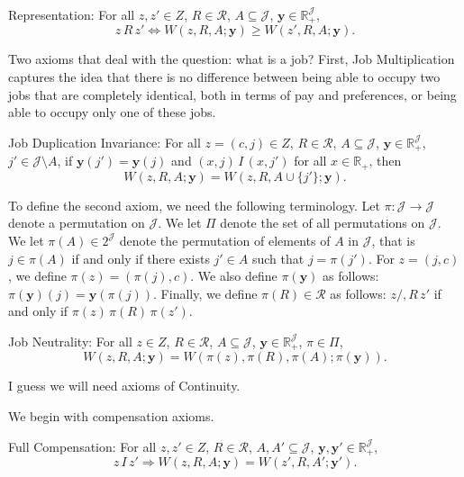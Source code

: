 \documentclass[12pt]{article}
\begin{document}
Representation: For all $z,z'\in Z$, $R\in \mathcal{R}$, $A\subseteq \mathcal{J}$, $\mathbf{y}\in \mathbb{R}_{+}^{\mathcal{J}}$, 
\begin{equation*}
\label{label1}
z\,R\,z'\Leftrightarrow W(z,R,A;\mathbf{y})\geq W(z',R,A;\mathbf{y}).
\end{equation*}

Two axioms that deal with the question: what is a job? First, Job Multiplication captures the idea that there is no difference between being able to occupy two jobs that are completely identical, both in terms of pay and preferences, or being able to occupy only one of these jobs.

Job Duplication Invariance: For all $z=(c,j)\in Z$, $R\in \mathcal{R}$, $A\subseteq \mathcal{J}$, $\mathbf{y}\in \mathbb{R}_{+}^{\mathcal{J}}$, $j'\in \mathcal{J}\setminus A$, if $\mathbf{y}(j')=\mathbf{y}(j)$ and $(x,j)\,I\,(x,j')$ for all $x\in\mathbb{R}_{+}$, then
\begin{equation*}
\label{label2}
W(z,R,A;\mathbf{y})=W(z,R,A\cup\{j'\};\mathbf{y}).
\end{equation*}

To define the second axiom, we need the following terminology. Let $\pi:\mathcal{J}\rightarrow \mathcal{J}$ denote a permutation on $\mathcal{J}$. We let $\Pi$ denote the set of all permutations on $\mathcal{J}$. We let $\pi(A)\in 2^{\mathcal{J}}$ denote the permutation of elements of $A$ in $\mathcal{J}$, that is $j\in\pi(A)$ if and only if there exists $j'\in A$ such that $j=\pi(j')$. For $z=(j,c)$, we define $\pi(z)=(\pi(j),c)$. We also define $\pi(\mathbf{y})$ as follows: $\pi(\mathbf{y})(j)=\mathbf{y}(\pi(j))$. Finally, we define $\pi(R)\in\mathcal{R}$ as follows: $z/,R\,z'$ if and only if $\pi(z)\,\pi(R)\,\pi(z')$.

Job Neutrality: For all $z\in Z$, $R\in \mathcal{R}$, $A\subseteq \mathcal{J}$, $\mathbf{y}\in \mathbb{R}_{+}^{\mathcal{J}}$, $\pi\in\Pi$,
\begin{equation*}
\label{ }
W(z,R,A;\mathbf{y})=W(\pi(z),\pi(R),\pi(A);\pi(\mathbf{y})).
\end{equation*}

I guess we will need axioms of Continuity.

We begin with compensation axioms.

Full Compensation: For all $z,z'\in Z$, $R\in \mathcal{R}$, $A,A'\subseteq \mathcal{J}$, $\mathbf{y}, \mathbf{y}' \in \mathbb{R}_{+}^{\mathcal{J}}$, 
\begin{equation*}
\label{ }
z\,I\,z'\Rightarrow W(z,R,A;\mathbf{y})=W(z',R,A';\mathbf{y}').
\end{equation*}
\end{document}
